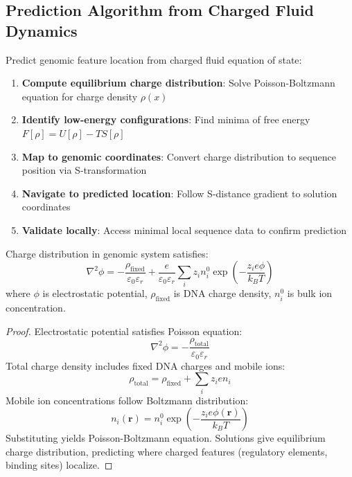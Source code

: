 \subsection{Prediction Algorithm from Charged Fluid Dynamics}

\begin{definition}
\label{def:charged_fluid_prediction}
Predict genomic feature location from charged fluid equation of state:
\begin{enumerate}
\item \textbf{Compute equilibrium charge distribution}: Solve Poisson-Boltzmann equation for charge density $\rho(x)$
\item \textbf{Identify low-energy configurations}: Find minima of free energy $F[\rho] = U[\rho] - TS[\rho]$
\item \textbf{Map to genomic coordinates}: Convert charge distribution to sequence position via S-transformation
\item \textbf{Navigate to predicted location}: Follow S-distance gradient to solution coordinates
\item \textbf{Validate locally}: Access minimal local sequence data to confirm prediction
\end{enumerate}
\end{definition}

\begin{theorem}
\label{thm:poisson_boltzmann_genome}
Charge distribution in genomic system satisfies:
\begin{equation}
\nabla^2\phi = -\frac{\rho_{\text{fixed}}}{\varepsilon_0\varepsilon_r} + \frac{e}{\varepsilon_0\varepsilon_r}\sum_i z_i n_i^0 \exp\left(-\frac{z_i e\phi}{k_BT}\right)
\end{equation}
where $\phi$ is electrostatic potential, $\rho_{\text{fixed}}$ is DNA charge density, $n_i^0$ is bulk ion concentration.
\end{theorem}

\begin{proof}
Electrostatic potential satisfies Poisson equation:
\begin{equation}
\nabla^2\phi = -\frac{\rho_{\text{total}}}{\varepsilon_0\varepsilon_r}
\end{equation}
Total charge density includes fixed DNA charges and mobile ions:
\begin{equation}
\rho_{\text{total}} = \rho_{\text{fixed}} + \sum_i z_i e n_i
\end{equation}
Mobile ion concentrations follow Boltzmann distribution:
\begin{equation}
n_i(\mathbf{r}) = n_i^0 \exp\left(-\frac{z_i e\phi(\mathbf{r})}{k_BT}\right)
\end{equation}
Substituting yields Poisson-Boltzmann equation. Solutions give equilibrium charge distribution, predicting where charged features (regulatory elements, binding sites) localize.
\end{proof}

